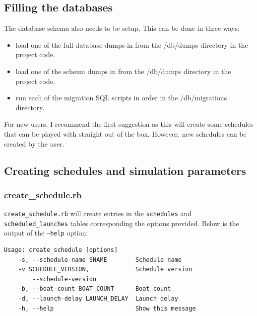 \subsection*{Filling the databases}

The database schema also needs to be setup. This can be done in three ways:
\begin{itemize}
  \item load one of the full database dumps in from the /db/dumps directory in the project code.
  \item load one of the schema dumps in from the /db/dumps directory in the project code.
  \item run each of the migration SQL scripts in order in the /db/migrations directory.
\end{itemize}
For new users, I recommend the first suggestion as this will create some schedules that can be played with straight out of the box. However, new schedules can be created by the user.

\subsection*{Creating schedules and simulation parameters}


\subsubsection*{create\_schedule.rb}

\texttt{create\_schedule.rb} will create entries in the \texttt{schedules} and \texttt{scheduled\_launches} tables corresponding the options provided. Below is the output of the \texttt{--help} option:

\begin{lstlisting}[basicstyle=\ttfamily]
Usage: create_schedule [options]
    -s, --schedule-name SNAME        Schedule name
    -v SCHEDULE_VERSION,             Schedule version
        --schedule-version
    -b, --boat-count BOAT_COUNT      Boat count
    -d, --launch-delay LAUNCH_DELAY  Launch delay
    -h, --help                       Show this message
\end{lstlisting}

